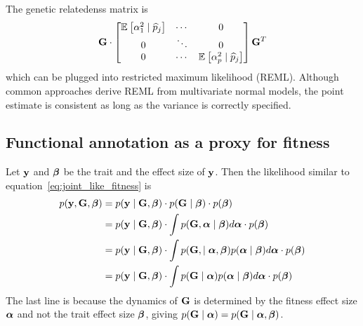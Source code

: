 \documentclass[10pt]{article}
\begin{document}
The genetic relatedenss matrix is
\begin{align}
    \mathbf{G} \cdot 
    \begin{bmatrix}
        \mathbb{E}_{}\left[\alpha_1^2 \mid \widehat{p}_j\right] & \cdots & 0 \\
        0 & \ddots & 0 \\
        0 & \cdots & \mathbb{E}_{}\left[\alpha_p^2 \mid \widehat{p}_j\right]
    \end{bmatrix}
    \mathbf{G}^T
\end{align}
which can be plugged into restricted maximum likelihood (REML).
Although common approaches derive REML from multivariate normal models,
the point estimate is consistent as long as the variance is correctly specified.

\subsection{Functional annotation as a proxy for fitness}

Let $\mathbf{y}$ and $\boldsymbol{\beta}$ be the trait and the effect size of $\mathbf{y}$.
Then the likelihood similar to equation~\ref{eq:joint_like_fitness} is
\begin{align}
    \begin{aligned}
    p(\mathbf{y}, \mathbf{G}, \boldsymbol{\beta}) 
    &= 
    p(\mathbf{y} \mid \mathbf{G}, \boldsymbol{\beta}) \cdot p(\mathbf{G} \mid \boldsymbol{\beta}) \cdot p(\boldsymbol{\beta})  \\
    &= 
    p(\mathbf{y} \mid \mathbf{G}, \boldsymbol{\beta}) \cdot \int p(\mathbf{G}, \boldsymbol{\alpha} \mid \boldsymbol{\beta}) d\boldsymbol{\alpha} \cdot p(\boldsymbol{\beta})  \\
    &=
    p(\mathbf{y} \mid \mathbf{G}, \boldsymbol{\beta}) \cdot \int p(\mathbf{G}, \mid \boldsymbol{\alpha} ,\boldsymbol{\beta}) p(\boldsymbol{\alpha} \mid \boldsymbol{\beta}) d\boldsymbol{\alpha} \cdot p(\boldsymbol{\beta})  \\
    &=
    p(\mathbf{y} \mid \mathbf{G}, \boldsymbol{\beta}) \cdot \int p(\mathbf{G} \mid \boldsymbol{\alpha}) p(\boldsymbol{\alpha} \mid \boldsymbol{\beta}) d\boldsymbol{\alpha} \cdot p(\boldsymbol{\beta})  \\
    \end{aligned}
\end{align}
The last line is because the dynamics of $\mathbf{G}$ is determined by the fitness effect size $\boldsymbol{\alpha}$ and not the trait effect size $\boldsymbol{\beta}$, 
giving $p(\mathbf{G} \mid \boldsymbol{\alpha}) = p(\mathbf{G} \mid \boldsymbol{\alpha}, \boldsymbol{\beta})$.
\end{document}
